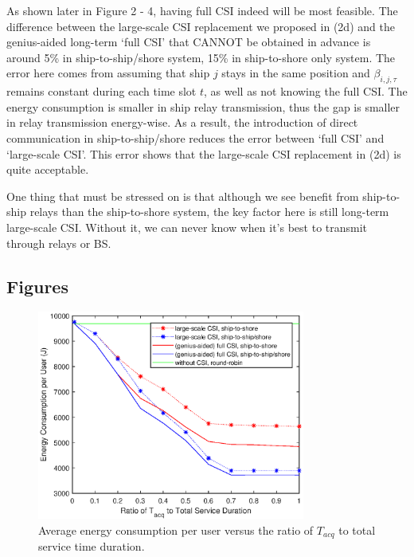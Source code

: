 \documentclass[conference]{IEEEtran}
\begin{document}
As shown later in Figure 2 - 4, having full CSI indeed will be most feasible. The difference between the large-scale CSI replacement we proposed in (2d) and the genius-aided long-term `full CSI' that CANNOT be obtained in advance is around 5\% in ship-to-ship/shore system, 15\% in ship-to-shore only system. The error here comes from assuming that ship $j$ stays in the same position and $\beta _{i,j,\tau }$ remains constant during each time slot $t$, as well as not knowing the full CSI. 
The energy consumption is smaller in ship relay transmission, thus the gap is smaller in relay transmission energy-wise. As a result, the introduction of direct communication in ship-to-ship/shore reduces the error between `full CSI' and `large-scale CSI'. 
This error shows that the large-scale CSI replacement in (2d) is quite acceptable. %

One thing that must be stressed on is that although we see benefit from ship-to-ship relays than the ship-to-shore system, the key factor here is still long-term large-scale CSI. Without it, we can never know when it's best to transmit through relays or BS. 

\subsection{Figures}

\begin{figure} [htb]
\begin{center}
\includegraphics*[width=8.8cm]{Tranges.eps}
\end{center}
\vspace*{-4mm} 
\caption{Average energy consumption per user versus the ratio of ${T_{acq}}$ to total service time duration.} \label{fig:2}
\vspace*{-2mm} 
\end{figure}
\end{document}
